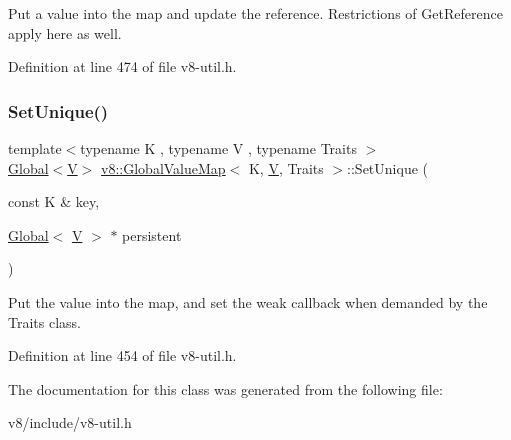 Put a value into the map and update the reference. Restrictions of Get\+Reference apply here as well. 

Definition at line 474 of file v8-\/util.\+h.

\mbox{\label{classv8_1_1GlobalValueMap_aad73de3912571a2f245454d3edea4a41}} 
\subsubsection{\texorpdfstring{Set\+Unique()}{SetUnique()}}
{\footnotesize\ttfamily template$<$typename K , typename V , typename Traits $>$ \\
\mbox{\hyperlink{classv8_1_1Global}{Global}}$<$\mbox{\hyperlink{classV}{V}}$>$ \mbox{\hyperlink{classv8_1_1GlobalValueMap}{v8\+::\+Global\+Value\+Map}}$<$ K, \mbox{\hyperlink{classV}{V}}, Traits $>$\+::Set\+Unique (\begin{DoxyParamCaption}\item[{const K \&}]{key,  }\item[{\mbox{\hyperlink{classv8_1_1Global}{Global}}$<$ \mbox{\hyperlink{classV}{V}} $>$ $\ast$}]{persistent }\end{DoxyParamCaption})\hspace{0.3cm}{\ttfamily [inline]}}

Put the value into the map, and set the \textquotesingle{}weak\textquotesingle{} callback when demanded by the Traits class. 

Definition at line 454 of file v8-\/util.\+h.



The documentation for this class was generated from the following file\+:\begin{DoxyCompactItemize}
\item 
v8/include/v8-\/util.\+h\end{DoxyCompactItemize}
